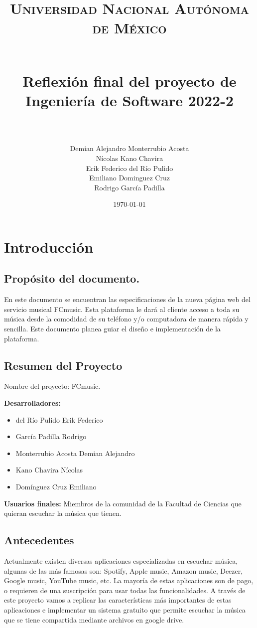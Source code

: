 \documentclass[12pt]{article}
\title{	
\normalfont \normalsize 
\textsc{Universidad Nacional Autónoma de México} \\
\horrule{0.5pt} \\[0.4cm]
\Huge  

Reflexión final del proyecto de Ingeniería de Software 2022-2 \\
\horrule{2pt} \\[0.5cm] 
}
\author{ 
Demian Alejandro Monterrubio Acosta  \\
Nícolas Kano Chavira \\
Erik Federico del Río Pulido  \\
Emiliano Dominguez Cruz\\
Rodrigo García Padilla\\
}
\date{\today}
\newcounter{ni}
\begin{document}
\maketitle
 

\newpage


\section{Introducción}

\subsection{ Propósito del documento.}
En este documento se encuentran las especificaciones de la nueva página web del servicio musical FCmusic. Esta plataforma le dará al cliente acceso a toda su música desde la comodidad de su teléfono y/o computadora de manera rápida y sencilla. Este documento planea guiar el diseño e implementación de la plataforma.\\

\subsection{Resumen del Proyecto}
Nombre del proyecto:     FCmusic.

\textbf{Desarrolladores:}
\begin{itemize}
    
    \item del Río Pulido Erik Federico
    \item García Padilla Rodrigo
    \item Monterrubio Acosta Demian Alejandro 
    \item Kano Chavira Nícolas
    \item Domínguez Cruz Emiliano

\end{itemize}

\textbf{Usuarios finales:}
Miembros de la comunidad de la Facultad de Ciencias que quieran escuchar la música que tienen.\\

\subsection{Antecedentes}
Actualmente existen diversas aplicaciones especializadas en escuchar música, algunas de las más famosas son: Spotify, Apple music, Amazon music, Deezer, Google music, YouTube music, etc. La mayoría de estas aplicaciones son de pago, o requieren de una suscripción para usar todas las funcionalidades. 
A través de este proyecto vamos a replicar las características más importantes de estas aplicaciones e implementar un sistema gratuito que permite escuchar la música que se tiene compartida mediante archivos en google drive.\\
\end{document}
